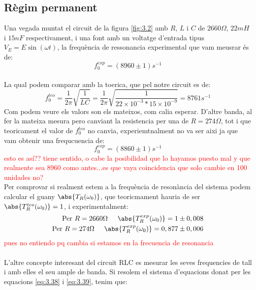 \documentclass[a4paper,10.5pt]{report}
\begin{document}
\subsection{Règim permanent}
Una vegada muntat el circuit de la figura \ref{fig:3.2} amb $R$, $L$ i $C$ de $2660\Omega$, $22mH$ i $15nF$ respectivament, i una font amb un voltatge d'entrada tipus $V_E = E\sin(\omega t)$, la frequència de ressonancia experimental que vam meusrar és de: \\
\begin{equation}
	f_0^{exp} = (8960 \pm 1)s^{-1}
\end{equation}\\
La qual podem comparar amb la toerica, que pel notre circuit es de:
\begin{equation}
	f_0^{teo} = \frac{1}{2\pi}\sqrt{\frac{1}{LC}} = \frac{1}{2\pi}\sqrt{\frac{1}{22 \times 10^{-3}*15 \times 10^{-9}}} = 8761 s^{-1}
\end{equation}
Com podem veure els valors son els mateixos, com calia esperar. D'altre banda, al fer la mateixa mesura pero canviant la resistencia per una de $R=274\Omega$, tot i que teoricament el valor de $f_0^{teo}$ no canvia, experiemtnalment no va ser aixi ja que vam obtenir una frequcuencia de:
\begin{equation}
	f_0^{exp} = (8860 \pm 1)s^{-1}
\end{equation}
\textcolor{red}{esto es así?? tiene sentido, o cabe la posibilidad que lo hayamos puesto mal y que realmente sea 8960 como antes...es que vaya coincidencia que solo cambie en 100 unidades no?}\\
Per comprovar si realment estem a la frequència de resonància del sistema podem calcular el guany $\abs{T_R(\omega_0)}$, que teoricmament hauria de ser $\abs{T_R^{teo}(\omega_0)} = 1$, i experimentalment:
\begin{eqnarray}
	\text{Per $R=2660\Omega$} \hspace{0.5cm} \abs{T_R^{exp}(\omega_0)} = 1 \pm 0,008\\
	\text{Per $R=274\Omega$} \hspace{0.5cm} \abs{T_R^{exp}(\omega_0)} = 0,877 \pm 0,006
\end{eqnarray}
\textcolor{red}{pues no entiendo pq cambia si estamos en la frecuencia de resonancia}\\
\\
L'altre concepte interesant del circuit RLC es mesurar les seves frequencies de tall i amb elles el seu ample de banda. Si resolem el sistema d'equacions donat per les equacions \eqref{eq:3.38} i \eqref{eq:3.39}, tenim que:
\end{document}
